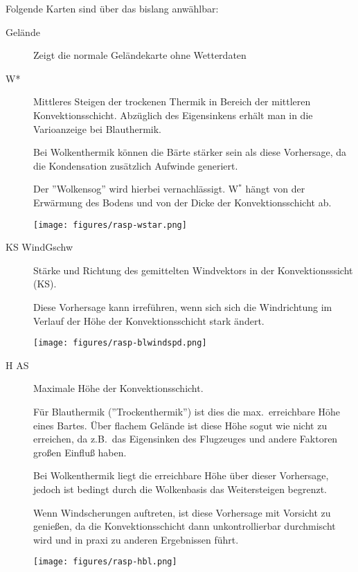Folgende Karten sind über das   bislang anwählbar:
\begin{description}
\item[Gelände] Zeigt die normale Geländekarte ohne Wetterdaten
\item[W*]
Mittleres Steigen  der trockenen Thermik in Bereich der mittleren Konvektionsschicht.
Abzüglich des Eigensinkens erhält man in die Varioanzeige  bei Blauthermik.

Bei Wolkenthermik können die Bärte stärker sein als diese Vorhersage,  da die
Kondensation zusätzlich Aufwinde generiert.

Der ''Wolkensog''  wird hierbei vernachlässigt.
W$^\ast$ hängt von der Erwärmung des Bodens  und von der Dicke der Konvektionsschicht ab.

\begin{center}
\texttt{[image: figures/rasp-wstar.png]}
\end{center}

\item[KS WindGschw]
Stärke und Richtung des gemittelten Windvektors  in der Konvektionsssicht (KS).

Diese Vorhersage kann irreführen, wenn sich sich die Windrichtung im Verlauf der
Höhe der Konvektionsschicht stark ändert.

\begin{center}
\texttt{[image: figures/rasp-blwindspd.png]}
\end{center}

\item[H AS]
Maximale Höhe der Konvektionsschicht.

Für Blauthermik (''Trockenthermik'') ist dies die max.\ erreichbare Höhe eines Bartes.
Über flachem Gelände ist diese Höhe sogut wie nicht zu erreichen, da z.B.\ das
Eigensinken des Flugzeuges und andere Faktoren großen Einfluß haben.

Bei Wolkenthermik liegt die erreichbare Höhe über dieser Vorhersage, jedoch ist
bedingt durch die Wolkenbasis das Weitersteigen begrenzt.

Wenn Windscherungen auftreten, ist diese Vorhersage mit Vorsicht zu genießen,
da die Konvektionsschicht dann unkontrollierbar durchmischt wird und in praxi zu
anderen Ergebnissen führt.

\begin{center}
\texttt{[image: figures/rasp-hbl.png]}
\end{center}


\end{description}
